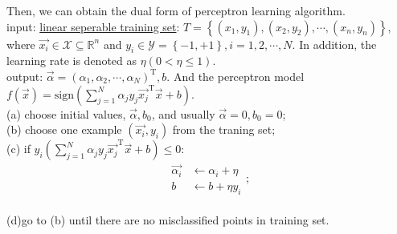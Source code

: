\documentclass[10pt,onecolumn]{book}
\begin{document}
Then, we can obtain the dual form of perceptron learning algorithm.\\
\indent	\indent input: \uline{linear seperable training set}: $T = \left\{ (x_1, y_1), (x_2, y_2), \cdots, (x_n ,y_n) \right\}$, where $\vec{x_i} \in \mathcal{X} \subseteq \mathbb{R}^n$ and $y_i \in \mathcal{Y} = \left\{-1, +1\right\}, i = 1, 2, \cdots, N$. In addition, the learning rate is denoted 
as $\eta (0 < \eta \le 1)$. \\
\indent \indent output: $\vec{\alpha} = (\alpha_1, \alpha_2, \cdots, \alpha_N)^\mathrm{T}, b$. And the perceptron model $f(\vec{x}) = \mathrm{sign}(\sum_{j=1}^{N} \alpha_j y_j \vec{x_j}^\mathrm{T} \vec{x} + b )$. \\
\indent \indent (a) choose initial values, $\vec{\alpha}, b_0$, and usually $\vec{\alpha} = 0, b_0 = 0$; \\
\indent \indent (b) choose one example $(\vec{x_i}, y_i)$ from the traning set; \\
\indent \indent (c) if $y_{i} (\sum_{j=1}^{N} \alpha_j y_j \vec{x_j}^\mathrm{T} \vec{x} + b) \le 0$:
\begin{equation}
\begin{split}
\vec{\alpha_i} & \gets \alpha_i + \eta \\
	b & \gets b + \eta y_i
\end{split};
\end{equation} \\
\indent \indent (d)go to (b) until there are no misclassified points in training set.
\end{document}
